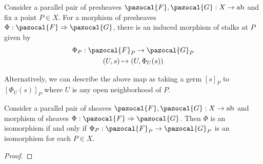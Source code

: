 \begin{definition}
    Consider a parallel pair of presheaves $\pazocal{F},\pazocal{G}: X\rightarrow \mathrm{ab}$ and fix a point $P\in X$. For a morphism of presheaves $\Phi : \pazocal{F}\Rightarrow \pazocal{G}$, there is an induced morphism of stalks at $P$ given by
    \begin{gather*}
        \Phi_P : \pazocal{F}_P \rightarrow \pazocal{G}_P\\
        (U,s)\mapsto (U,\Phi_U(s))
    \end{gather*}
\end{definition}
\begin{remark}
    Alternatively, we can describe the above map as taking a germ $[s]_P$ to $[\Phi_U(s)]_P$ where $U$ is any open neighborhood of $P$. 
\end{remark}
\begin{proposition}
    Consider a parallel pair of sheaves $\pazocal{F},\pazocal{G}: X\rightarrow \mathrm{ab}$ and morphism of sheaves $\Phi: \pazocal{F}\Rightarrow \pazocal{G}$. Then $\Phi$ is an isomorphism if and only if $\Phi_P:\pazocal{F}_P\rightarrow \pazocal{G}_P$ is an isomorphism for each $P\in X$.  
\end{proposition}
\begin{proof}    
\end{proof}

